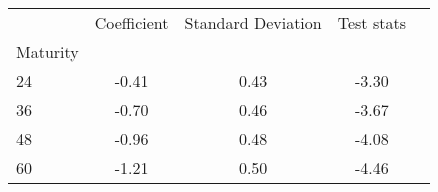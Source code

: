 \begin{tabular}{lcccc}
\toprule
{} &  Coefficient &  Standard Deviation &  Test stats \\
Maturity &              &                     &             \\
\midrule
24       &        -0.41 &                0.43 &       -3.30 \\
36       &        -0.70 &                0.46 &       -3.67 \\
48       &        -0.96 &                0.48 &       -4.08 \\
60       &        -1.21 &                0.50 &       -4.46 \\
\bottomrule
\end{tabular}
